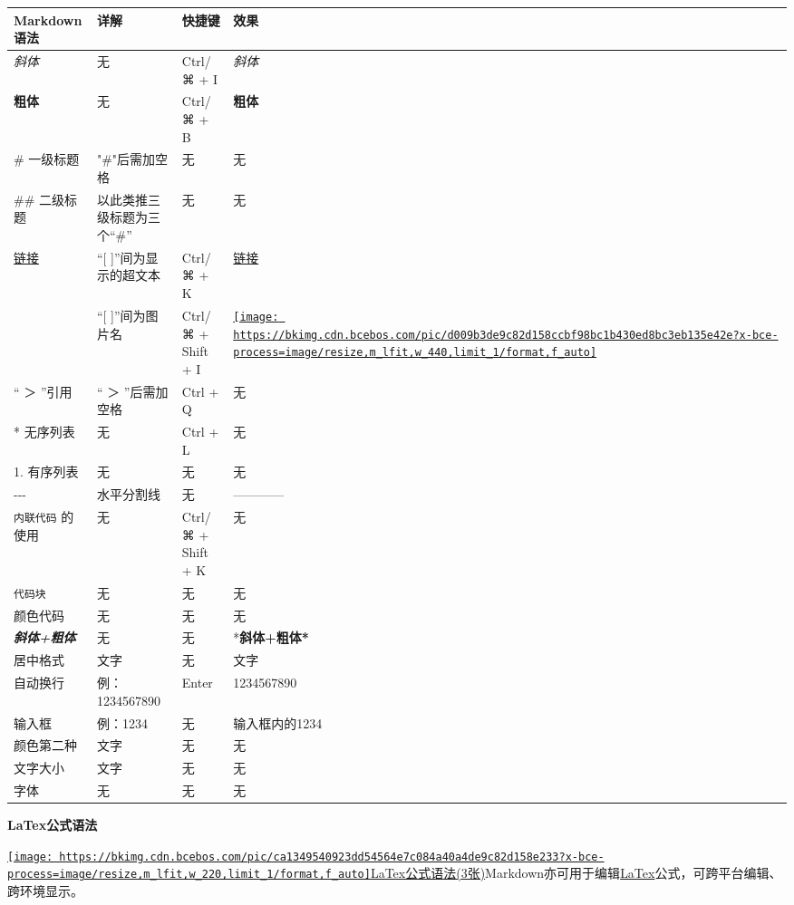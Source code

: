 \documentclass[
]{article}
\begin{document}
\begin{longtable}[]{@{}llll@{}}
\toprule
\textbf{Markdown语法} & \textbf{详解} & \textbf{快捷键} &
\textbf{效果} \\
\midrule
\endhead
\emph{斜体} & 无 & Ctrl/⌘ + I & \emph{斜体} \\
\textbf{粗体} & 无 & Ctrl/⌘ + B & \textbf{粗体} \\
\# 一级标题 & "\#"后需加空格 & 无 & 无 \\
\#\# 二级标题 & 以此类推三级标题为三个``\#'' & 无 & 无 \\
\href{http://a}{链接} & ``{[} {]}''间为显示的超文本 & Ctrl/⌘ + K &
\href{https://baike.baidu.com/item/链接/2665501}{链接} \\
& ``{[} {]}''间为图片名 & Ctrl/⌘ + Shift + I &
\href{https://baike.baidu.com/pic/markdown/3245829/0/d009b3de9c82d158ccbf98bc1b430ed8bc3eb135e42e?fr=lemma\&ct=single}{\texttt{[image: https://bkimg.cdn.bcebos.com/pic/d009b3de9c82d158ccbf98bc1b430ed8bc3eb135e42e?x-bce-process=image/resize,m\_lfit,w\_440,limit\_1/format,f\_auto]}} \\
`` ＞ ''引用 & `` ＞ ''后需加空格 & Ctrl + Q & 无 \\
* 无序列表 & 无 & Ctrl + L & 无 \\
1. 有序列表 & 无 & 无 & 无 \\
-\/-\/- & 水平分割线 & 无 & ------------ \\
\texttt{内联代码} 的使用 & 无 & Ctrl/⌘ + Shift + K & 无 \\
\texttt{代码块} & 无 & 无 & 无 \\
颜色代码 & 无 & 无 & 无 \\
\emph{\textbf{斜体+粗体}} & 无 & 无 & *\textbf{斜体+粗体*} \\
居中格式 & 文字 & 无 & 文字 \\
自动换行 & 例：1234567890 & Enter & 1234567890 \\
输入框 & 例：1234 & 无 & 输入框内的1234 \\
颜色第二种 & 文字 & 无 & 无 \\
文字大小 & 文字 & 无 & 无 \\
字体 & 无 & 无 & 无 \\
\bottomrule
\end{longtable}

\textbf{LaTex公式语法}

\href{https://baike.baidu.com/pic/markdown/3245829/1363805638/ca1349540923dd54564e7c084a40a4de9c82d158e233?fr=lemma\&ct=cover}{\texttt{[image: https://bkimg.cdn.bcebos.com/pic/ca1349540923dd54564e7c084a40a4de9c82d158e233?x-bce-process=image/resize,m\_lfit,w\_220,limit\_1/format,f\_auto]}LaTex公式语法(3张)}Markdown亦可用于编辑\href{https://baike.baidu.com/item/LaTex/1212106}{LaTex}公式，可跨平台编辑、跨环境显示。
\end{document}
